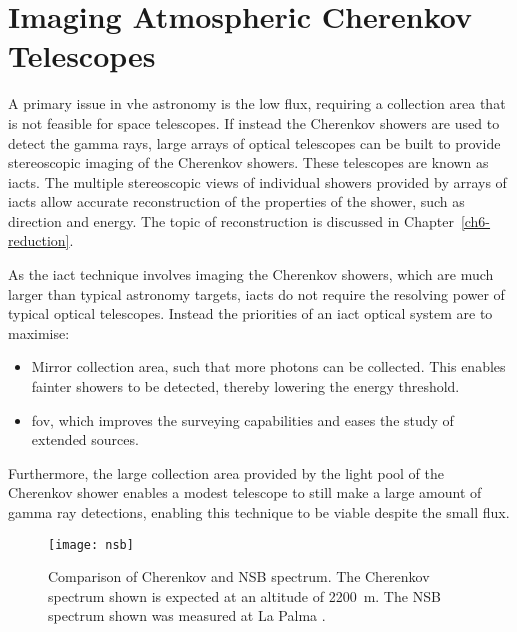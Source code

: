 \section{Imaging Atmospheric Cherenkov Telescopes}

A primary issue in \gls{vhe} astronomy is the low flux, requiring a collection area that is not feasible for space telescopes. If instead the Cherenkov showers are used to detect the gamma rays, large arrays of optical telescopes can be built to provide stereoscopic imaging of the Cherenkov showers. These telescopes are known as \glspl{iact}. The multiple stereoscopic views of individual showers provided by arrays of \glspl{iact} allow accurate reconstruction of the properties of the shower, such as direction and energy. The topic of reconstruction is discussed in Chapter~\ref{ch6-reduction}.

As the \gls{iact} technique involves imaging the Cherenkov showers, which are much larger than typical astronomy targets, \glspl{iact} do not require the resolving power of typical optical telescopes. Instead the priorities of an \gls{iact} optical system are to maximise: 
\begin{itemize}
\item Mirror collection area, such that more photons can be collected. This enables fainter showers to be detected, thereby lowering the energy threshold.
\item \gls{fov}, which improves the surveying capabilities and eases the study of extended sources.
\end{itemize}
Furthermore, the large collection area provided by the light pool of the Cherenkov shower enables a modest telescope to still make a large amount of gamma ray detections, enabling this technique to be viable despite the small flux.

\begin{figure}
	\centering\texttt{[image: nsb]} 
	\caption[Comparison of Cherenkov and NSB spectrum.]{Comparison of Cherenkov and NSB spectrum. The Cherenkov spectrum shown is expected at an altitude of \SI{2200}{m}. The NSB spectrum shown was measured at La Palma \cite{Bouvier2013}.}
	\label{fig:nsb}
\end{figure}

